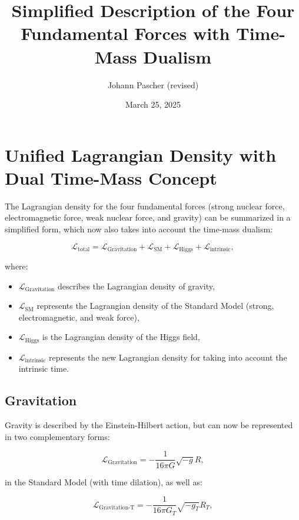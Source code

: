 \documentclass{article}
\title{Simplified Description of the Four Fundamental Forces with Time-Mass Dualism}
\author{Johann Pascher (revised)}
\date{March 25, 2025}
\begin{document}
	
	\maketitle
	
	\tableofcontents
	\newpage
	
	\section{Unified Lagrangian Density with Dual Time-Mass Concept}
	
	The Lagrangian density for the four fundamental forces (strong nuclear force, electromagnetic force, weak nuclear force, and gravity) can be summarized in a simplified form, which now also takes into account the time-mass dualism:
	
	\begin{equation}
		\mathcal{L}_\text{total} = \mathcal{L}_\text{Gravitation} + \mathcal{L}_\text{SM} + \mathcal{L}_\text{Higgs} + \mathcal{L}_\text{intrinsic},
	\end{equation}
	
	where:
	\begin{itemize}
		\item $\mathcal{L}_\text{Gravitation}$ describes the Lagrangian density of gravity,
		\item $\mathcal{L}_\text{SM}$ represents the Lagrangian density of the Standard Model (strong, electromagnetic, and weak force),
		\item $\mathcal{L}_\text{Higgs}$ is the Lagrangian density of the Higgs field,
		\item $\mathcal{L}_\text{intrinsic}$ represents the new Lagrangian density for taking into account the intrinsic time.
	\end{itemize}
	
	\subsection{Gravitation}
	Gravity is described by the Einstein-Hilbert action, but can now be represented in two complementary forms:
	
	\begin{equation}
		\mathcal{L}_\text{Gravitation} = -\frac{1}{16\pi G} \sqrt{-g} R,
	\end{equation}
	
	in the Standard Model (with time dilation), as well as:
	
	\begin{equation}
		\mathcal{L}_\text{Gravitation-T} = -\frac{1}{16\pi G_T} \sqrt{-g_T} R_T,
	\end{equation}
	
\end{document}
